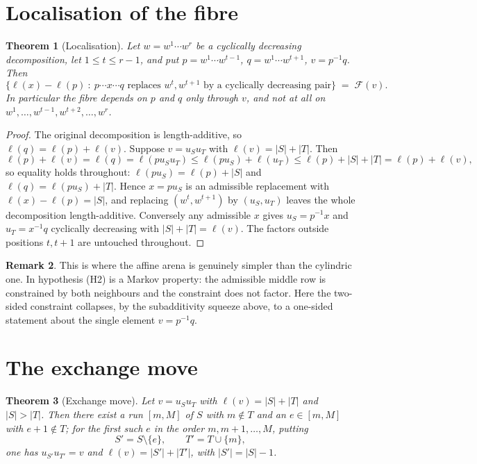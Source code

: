 \documentclass[11pt]{article}
\newtheorem{thm}{Theorem}[section]
\theoremstyle{definition}
\newtheorem{rem}[thm]{Remark}
\begin{document}
\section{Localisation of the fibre}

\begin{thm}[Localisation]\label{thm:localise}
Let $w=w^1\cdots w^r$ be a cyclically decreasing decomposition, let $1\le t\le r-1$, and put
$p=w^1\cdots w^{t-1}$, $q=w^1\cdots w^{t+1}$, $v=p^{-1}q$. Then
\[
  \bigl\{\ell(x)-\ell(p)\ :\ \text{$p\cdots x\cdots q$ replaces $w^t,w^{t+1}$ by a
  cyclically decreasing pair}\bigr\}\;=\;\mathcal F(v).
\]
In particular the fibre depends on $p$ and $q$ only through $v$, and not at all on
$w^1,\dots,w^{t-1},w^{t+2},\dots,w^r$.
\end{thm}

\begin{proof}
The original decomposition is length-additive, so $\ell(q)=\ell(p)+\ell(v)$. Suppose
$v=u_Su_T$ with $\ell(v)=|S|+|T|$. Then
\[
 \ell(p)+\ell(v)=\ell(q)=\ell(pu_Su_T)\le \ell(pu_S)+\ell(u_T)\le \ell(p)+|S|+|T|=\ell(p)+\ell(v),
\]
so equality holds throughout: $\ell(pu_S)=\ell(p)+|S|$ and $\ell(q)=\ell(pu_S)+|T|$. Hence
$x=pu_S$ is an admissible replacement with $\ell(x)-\ell(p)=|S|$, and replacing
$(w^t,w^{t+1})$ by $(u_S,u_T)$ leaves the whole decomposition length-additive. Conversely any
admissible $x$ gives $u_S=p^{-1}x$ and $u_T=x^{-1}q$ cyclically decreasing with
$|S|+|T|=\ell(v)$. The factors outside positions $t,t+1$ are untouched throughout.
\end{proof}

\begin{rem}
This is where the affine arena is genuinely simpler than the cylindric one. In
\cite{Clio2026} hypothesis (H2) is a Markov property: the admissible middle row is constrained
by both neighbours and the constraint does not factor. Here the two-sided constraint collapses,
by the subadditivity squeeze above, to a one-sided statement about the single element
$v=p^{-1}q$.
\end{rem}

\section{The exchange move}

\begin{thm}[Exchange move]\label{thm:exchange}
Let $v=u_Su_T$ with $\ell(v)=|S|+|T|$ and $|S|>|T|$. Then there exist a run $[m,M]$ of $S$ with
$m\notin T$ and an $e\in[m,M]$ with $e+1\notin T$; for the first such $e$ in the order
$m,m+1,\dots,M$, putting
\[
  S'=S\setminus\{e\},\qquad T'=T\cup\{m\},
\]
one has $u_{S'}u_{T'}=v$ and $\ell(v)=|S'|+|T'|$, with $|S'|=|S|-1$.
\end{thm}
\end{document}
